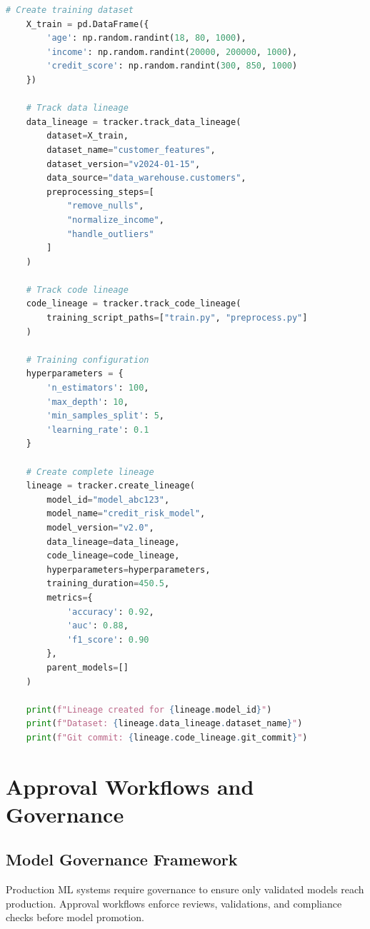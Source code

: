 \begin{lstlisting}[language=Python, caption=Model Lineage Tracker]
    # Create training dataset
    X_train = pd.DataFrame({
        'age': np.random.randint(18, 80, 1000),
        'income': np.random.randint(20000, 200000, 1000),
        'credit_score': np.random.randint(300, 850, 1000)
    })

    # Track data lineage
    data_lineage = tracker.track_data_lineage(
        dataset=X_train,
        dataset_name="customer_features",
        dataset_version="v2024-01-15",
        data_source="data_warehouse.customers",
        preprocessing_steps=[
            "remove_nulls",
            "normalize_income",
            "handle_outliers"
        ]
    )

    # Track code lineage
    code_lineage = tracker.track_code_lineage(
        training_script_paths=["train.py", "preprocess.py"]
    )

    # Training configuration
    hyperparameters = {
        'n_estimators': 100,
        'max_depth': 10,
        'min_samples_split': 5,
        'learning_rate': 0.1
    }

    # Create complete lineage
    lineage = tracker.create_lineage(
        model_id="model_abc123",
        model_name="credit_risk_model",
        model_version="v2.0",
        data_lineage=data_lineage,
        code_lineage=code_lineage,
        hyperparameters=hyperparameters,
        training_duration=450.5,
        metrics={
            'accuracy': 0.92,
            'auc': 0.88,
            'f1_score': 0.90
        },
        parent_models=[]
    )

    print(f"Lineage created for {lineage.model_id}")
    print(f"Dataset: {lineage.data_lineage.dataset_name}")
    print(f"Git commit: {lineage.code_lineage.git_commit}")
\end{lstlisting}

\section{Approval Workflows and Governance}

\subsection{Model Governance Framework}

Production ML systems require governance to ensure only validated models reach production. Approval workflows enforce reviews, validations, and compliance checks before model promotion.

